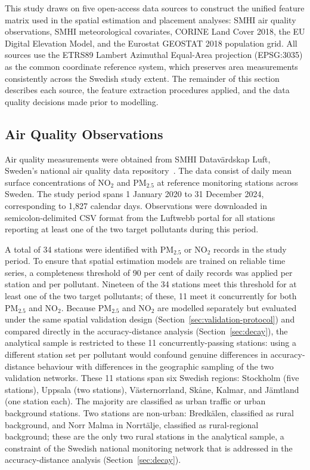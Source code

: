 \documentclass[11pt,a4paper]{article}
\let\oldsubsection\subsection
\renewcommand{\subsection}{\FloatBarrier\oldsubsection}
\begin{document}
This study draws on five open-access data sources to construct the unified feature matrix used in the spatial estimation and placement analyses: SMHI air quality observations, SMHI meteorological covariates, CORINE Land Cover 2018, the EU Digital Elevation Model, and the Eurostat GEOSTAT 2018 population grid. All sources use the ETRS89 Lambert Azimuthal Equal-Area projection (EPSG:3035) as the common coordinate reference system, which preserves area measurements consistently across the Swedish study extent. The remainder of this section describes each source, the feature extraction procedures applied, and the data quality decisions made prior to modelling.

\subsection{Air Quality Observations}
\label{sec:data-aq}

Air quality measurements were obtained from SMHI Datavärdskap Luft, Sweden's national air quality data repository~\cite{smhi_luftwebb}.
The data consist of daily mean surface concentrations of NO$_2$ and PM$_{2.5}$ at reference monitoring stations across Sweden. The study period spans 1 January 2020 to 31 December 2024, corresponding to 1,827 calendar days. Observations were downloaded in semicolon-delimited CSV format from the Luftwebb portal for all stations reporting at least one of the two target pollutants during this period.

A total of 34 stations were identified with PM$_{2.5}$ or NO$_2$ records in the study period. To ensure that spatial estimation models are trained on reliable time series, a completeness threshold of 90 per cent of daily records was applied per station and per pollutant. Nineteen of the 34 stations meet this threshold for at least one of the two target pollutants; of these, 11 meet it concurrently for both PM$_{2.5}$ and NO$_2$. Because PM$_{2.5}$ and NO$_2$ are modelled separately but evaluated under the same spatial validation design (Section~\ref{sec:validation-protocol}) and compared directly in the accuracy-distance analysis (Section~\ref{sec:decay}), the analytical sample is restricted to these 11 concurrently-passing stations: using a different station set per pollutant would confound genuine differences in accuracy-distance behaviour with differences in the geographic sampling of the two validation networks. These 11 stations span six Swedish regions: Stockholm (five stations), Uppsala (two stations), Västernorrland, Skåne, Kalmar, and Jämtland (one station each). The majority are classified as urban traffic or urban background stations. Two stations are non-urban: Bredkälen, classified as rural background, and Norr Malma in Norrtälje, classified as rural-regional background; these are the only two rural stations in the analytical sample, a constraint of the Swedish national monitoring network that is addressed in the accuracy-distance analysis (Section~\ref{sec:decay}).
\end{document}
